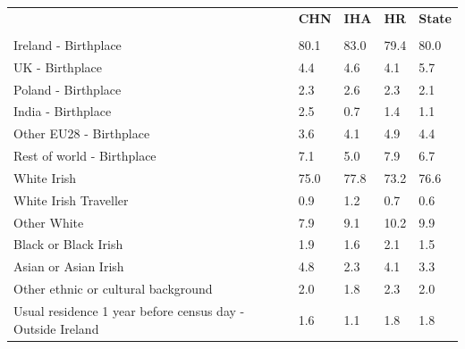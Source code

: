 \documentclass{article}
\begin{document}
\pagebreak
\begin{table}[h]	
\centering
		\begin{tabular}{KTTTT}
  \hline
& \textbf{CHN} & \textbf{IHA} & \textbf{HR}& \textbf{State}\\ 
  \hline
    \\ 
    \hline
Ireland - Birthplace & 80.1& 83.0& 79.4& 80.0\\
UK - Birthplace & 4.4& 4.6& 4.1& 5.7\\
Poland - Birthplace & 2.3& 2.6& 2.3& 2.1\\
India - Birthplace & 2.5& 0.7& 1.4& 1.1\\
Other EU28 - Birthplace & 3.6& 4.1& 4.9& 4.4\\
Rest of world - Birthplace & 7.1& 5.0& 7.9& 6.7\\
    \hline
White Irish & 75.0& 77.8& 73.2& 76.6\\
White Irish Traveller & 0.9& 1.2& 0.7& 0.6\\
Other White &  7.9&  9.1& 10.2&  9.9\\
Black or Black Irish & 1.9& 1.6& 2.1& 1.5\\
Asian or Asian Irish & 4.8& 2.3& 4.1& 3.3\\
Other ethnic or cultural background & 2.0& 1.8& 2.3& 2.0\\
    \hline
Usual residence 1 year before census day - Outside Ireland & 1.6& 1.1& 1.8& 1.8\\


\end{tabular}
\end{table}
\end{document}
